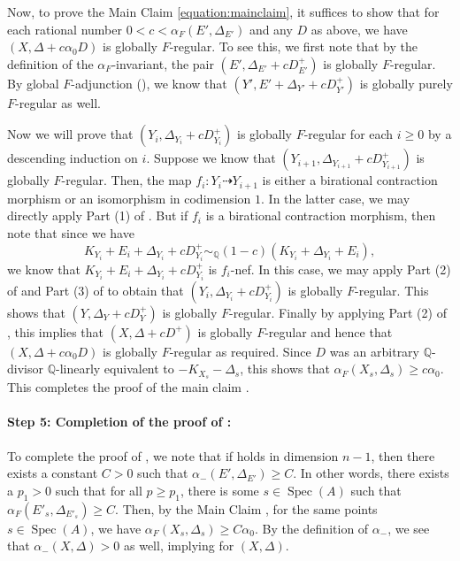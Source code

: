 \documentclass[11pt,reqno]{amsart}
\newcommand{\Q}{\mathbb{Q}}
\newcommand{\bQ}{\mathbb{Q}}
\DeclareMathOperator{\Spec}{Spec}
\numberwithin{equation}{section}
\theoremstyle{definition}
\newcommand{\FA}{\alpha_{F}}
\begin{document}

Now, to prove the Main Claim \ref{equation:mainclaim}, it suffices to show that for each rational number $0 < c < \FA(E', \Delta_{E'})$ and any $D$ as above, we have $(X, \Delta+ c\alpha_0 D)$ is globally $F$-regular. To see this, we first note that by the definition of the $\FA$-invariant, the pair 
$(E',\Delta_{E'} + cD^+ _{E'})$ is globally $F$-regular. By global $F$-adjunction (), we know that $(Y', E' + \Delta_{Y'}+ cD^+_{Y'})$ is globally purely $F$-regular as well.

Now we will prove that $(Y_i,  \Delta_{Y_i} + cD_{Y_i} ^+)$ is globally $F$-regular for each $i \geq 0$ by a descending induction on $i$. Suppose we know that $(Y_{i+1},  \Delta_{Y_{i+1}} + cD_{Y_{i+1}} ^+)$ is globally $F$-regular. Then, the map $f_i: Y_i \dashrightarrow Y_{i+1}$ is either a birational contraction morphism or an isomorphism in codimension $1$. In the latter case, we may directly apply Part (1) of . But if $f_i$ is a birational contraction morphism, then note that since we have
\[K_{Y_i} + E_i+ \Delta_{Y_i}+ cD^+ _{Y_i} \sim_\Q (1-c) (K_{Y_i} +\Delta_{Y_i}+ E_i), \] 
we know that $K_{Y_i} + E_i+ \Delta_{Y_i}+ cD^+ _{Y_i}$ is $f_i$-nef. In this case, we may apply Part (2) of  and Part (3) of  to obtain that $(Y_i, \Delta_{Y_i} + cD_{Y_i}^+)$ is globally $F$-regular. This shows that $(Y, \Delta_Y + cD_Y ^+)  $ is globally $F$-regular. Finally by applying Part (2) of , this  implies that $(X, \Delta+cD^+)$ is globally $F$-regular and hence that $(X, \Delta + c\alpha_0  D)$ is globally $F$-regular as required. Since $D$ was an arbitrary $\bQ$-divisor $\Q$-linearly equivalent to $-K_{X_s} - \Delta_{s}$, this shows that
$\alpha_F(X_s, \Delta_s) \geq c \alpha_0$. This completes the proof of the main claim .

\medskip

\paragraph{\textbf{Step 5: Completion of the proof of :}} 
To complete the proof of , we note that if  holds in dimension $n -1$, then there exists a constant $C >0 $ such that $\alpha_{-} (E', \Delta_{E'}) \geq C$. In other words, there exists a $p_1 >0 $ such that for all $p \geq p_1$, there is some $s \in \Spec(A)$ such that $ \FA (E'_s , \Delta_{E'_s}) \geq C $. Then, by the Main Claim , for the same points $s \in \Spec(A)$, we have $\FA(X_s, \Delta_s) \geq C \alpha_0$. By the definition of $\alpha_-$, we see that $\alpha_- (X, \Delta) > 0 $ as well, implying  for $(X, \Delta)$.
\end{document}
